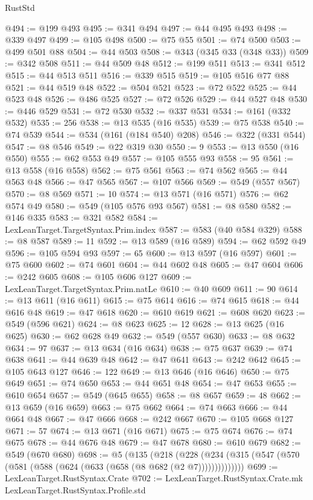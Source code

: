 \begin{lexlean}{RustStd}
\begin{coremodule}
@494 := @199 @493
@495 := @341 @494
@497 := @44 @495 @493
@498 := @339 @497
@499 := @105 @498
@500 := @75 @55
@501 := @74 @500
@503 := @499 @501 @88
@504 := @44 @503
@508 := @343 (@345 @33 (@348 @33))
@509 := @342 @508
@511 := @44 @509 @48
@512 := @199 @511
@513 := @341 @512
@515 := @44 @513 @511
@516 := @339 @515
@519 := @105 @516 @77 @88
@521 := @44 @519 @48
@522 := @504 @521
@523 := @72 @522
@525 := @44 @523 @48
@526 := @486 @525
@527 := @72 @526
@529 := @44 @527 @48
@530 := @446 @529
@531 := @72 @530
@532 := @337 @531
@534 := @161 (@332 @532)
@535 := 256
@538 := @13 @535 (@16 @535)
@539 := @75 @538
@540 := @74 @539
@544 := @534 (@161 (@184 @540) @208)
@546 := @322 (@331 @544)
@547 := @8 @546
@549 := @22 @319 @30
@550 := 9
@553 := @13 @550 (@16 @550)
@555 := @62 @553 @49
@557 := @105 @555 @93
@558 := 95
@561 := @13 @558 (@16 @558)
@562 := @75 @561
@563 := @74 @562
@565 := @44 @563 @48
@566 := @47 @565
@567 := @107 @566
@569 := @549 (@557 @567)
@570 := @8 @569
@571 := 10
@574 := @13 @571 (@16 @571)
@576 := @62 @574 @49
@580 := @549 (@105 @576 @93 @567)
@581 := @8 @580
@582 := @146 @335
@583 := @321 @582
@584 := LexLeanTarget.TargetSyntax.Prim.index
@587 := @583 (@40 @584 @329)
@588 := @8 @587
@589 := 11
@592 := @13 @589 (@16 @589)
@594 := @62 @592 @49
@596 := @105 @594 @93
@597 := 65
@600 := @13 @597 (@16 @597)
@601 := @75 @600
@602 := @74 @601
@604 := @44 @602 @48
@605 := @47 @604
@606 := @242 @605
@608 := @105 @606 @127
@609 := LexLeanTarget.TargetSyntax.Prim.natLe
@610 := @40 @609
@611 := 90
@614 := @13 @611 (@16 @611)
@615 := @75 @614
@616 := @74 @615
@618 := @44 @616 @48
@619 := @47 @618
@620 := @610 @619
@621 := @608 @620
@623 := @549 (@596 @621)
@624 := @8 @623
@625 := 12
@628 := @13 @625 (@16 @625)
@630 := @62 @628 @49
@632 := @549 (@557 @630)
@633 := @8 @632
@634 := 97
@637 := @13 @634 (@16 @634)
@638 := @75 @637
@639 := @74 @638
@641 := @44 @639 @48
@642 := @47 @641
@643 := @242 @642
@645 := @105 @643 @127
@646 := 122
@649 := @13 @646 (@16 @646)
@650 := @75 @649
@651 := @74 @650
@653 := @44 @651 @48
@654 := @47 @653
@655 := @610 @654
@657 := @549 (@645 @655)
@658 := @8 @657
@659 := 48
@662 := @13 @659 (@16 @659)
@663 := @75 @662
@664 := @74 @663
@666 := @44 @664 @48
@667 := @47 @666
@668 := @242 @667
@670 := @105 @668 @127
@671 := 57
@674 := @13 @671 (@16 @671)
@675 := @75 @674
@676 := @74 @675
@678 := @44 @676 @48
@679 := @47 @678
@680 := @610 @679
@682 := @549 (@670 @680)
@698 := @5
    (@135
      (@218
        (@228 (@234 (@315 (@547 (@570 (@581 (@588 (@624 (@633 (@658 (@8 @682 (@2 @7))))))))))))))
@699 := LexLeanTarget.RustSyntax.Crate
@702 := LexLeanTarget.RustSyntax.Crate.mk LexLeanTarget.RustSyntax.Profile.std

\end{coremodule}
\end{lexlean}
